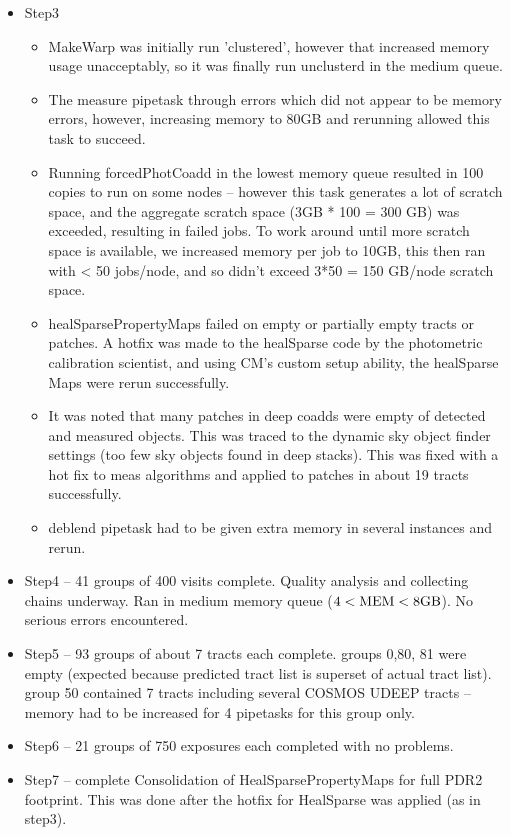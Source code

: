 \begin{itemize}
\item Step3
\begin{itemize}

  \item
	MakeWarp was initially run 'clustered', however that increased memory
	usage unacceptably, so it was finally run unclusterd in the medium 
	queue.

  \item
	  The measure pipetask through errors which did not appear to be
	memory errors, however, increasing memory to 80GB and rerunning
	allowed this task to succeed.

  \item
	Running forcedPhotCoadd in the lowest memory queue resulted in
	100 copies to run on some nodes -- however this task generates a lot
	of scratch space, and the aggregate scratch space (3GB * 100 = 300 GB)
	was exceeded, resulting in failed jobs.
	To work around until more scratch space is available, we increased
	memory per job to 10GB, this then ran with < 50 jobs/node, and so
	didn't exceed 3*50 = 150 GB/node scratch space.

  \item
	  healSparsePropertyMaps failed on empty or partially empty tracts
	or patches.  A hotfix was made to the healSparse code by the photometric
	calibration scientist,  and using CM's custom setup ability, 
	the healSparse Maps were rerun successfully.

 \item
	 It was noted that many patches in deep coadds were empty of detected
	and measured objects. This was traced to the dynamic sky object finder
	settings (too few sky objects found in deep stacks).  This
	was fixed with a hot fix to meas algorithms and applied to patches
	in about 19 tracts successfully.

  \item
	 deblend pipetask had to be given extra memory in several instances 
	and rerun.

\end{itemize} %

\item Step4 -- 41 groups of 400 visits complete.  Quality analysis and
		collecting chains underway.  Ran in medium memory
		queue ($\rm 4 < MEM < 8 GB$).  No serious errors
		encountered.
	
\item Step5 -- 93 groups of about 7 tracts each complete.  groups 0,80, 81 were empty (expected because
	predicted tract list is superset of actual tract list).  group 50 contained 7 tracts including
	several COSMOS UDEEP tracts -- memory had to be increased for 4 pipetasks for this group only.

\item Step6 -- 21 groups of 750 exposures each completed with no problems.

\item Step7 -- complete Consolidation of HealSparsePropertyMaps for full PDR2 footprint.  This was done after the hotfix for HealSparse was applied (as in
	step3).

\end{itemize} %

